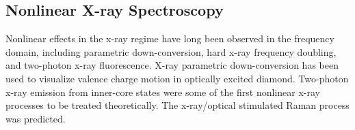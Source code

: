 \documentclass{ar-1col}
\begin{document}
\subsection{Nonlinear X-ray Spectroscopy}

Nonlinear effects in the x-ray regime have long been observed in the
frequency domain,\cite{adams_nonlinear_2003} including parametric
down-conversion,\cite{danino_parametric_1981,freund_parametric_1969,yoda_x-ray_1998,adams_parametric_2000}
hard x-ray frequency doubling,\cite{nazarkin_nonlinear_2003} and
two-photon x-ray fluorescence.\cite{freund_nonlinear_1972} X-ray
parametric down-conversion has been used to visualize  valence
charge motion in optically excited
diamond.\cite{tamasaku_visualizing_2011}  Two-photon
x-ray emission from inner-core states were some of the first nonlinear x-ray processes to be treated
theoretically.\cite{bannett_two-photon_1982} The x-ray/optical
stimulated Raman process was predicted.
\cite{arya_microscopic_1974,hudis_xray_1994,freund_surface_1973}
\end{document}
